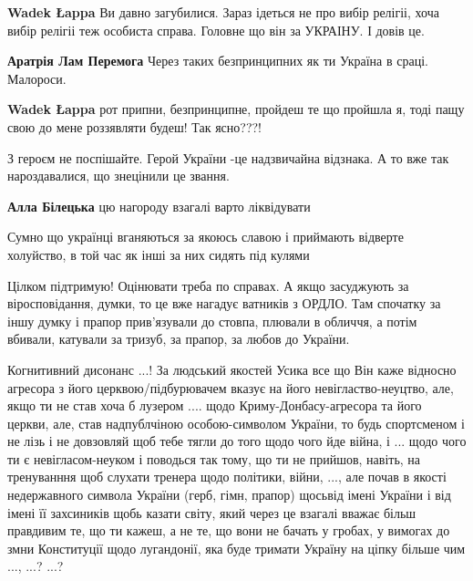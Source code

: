 \begin{itemize}
\begin{itemize}
\textbf{Wadek Łappa}
Ви давно загубилися.
Зараз ідеться не про вибір релігіі, хоча вибір релігіі теж особиста справа. Головне що він за УКРАІНУ. І довів це.

\textbf{Аратрія Лам Перемога} Через таких безпринципних як ти Україна в сраці. Малороси.

\textbf{Wadek Łappa} рот припни, безпринципне, пройдеш те що пройшла я, тоді пащу свою до мене роззявляти будеш! Так ясно???!
\end{itemize} %

З героєм не поспішайте. Герой України -це надзвичайна відзнака. А то вже так нароздавалися, що знецінили це звання.

\begin{itemize} %
\textbf{Алла Білецька} цю нагороду взагалі варто ліквідувати
\end{itemize} %

Сумно що українці вганяються за якоюсь славою і приймають відверте холуйство, в той час як інші за них сидять під кулями


Цілком підтримую! Оцінювати треба по справах. А якщо засуджують за
віросповідання, думки, то це вже нагадує ватників з ОРДЛО. Там спочатку за іншу
думку і прапор прив'язували до стовпа, плювали в обличчя, а потім вбивали,
катували за тризуб, за прапор, за любов до України.


Когнитивний дисонанс ...! За людський якостей Усика все що Він каже відносно
агресора з його церквою/підбурювачем вказує на його невігластво-неуцтво, але,
якщо ти не став хоча б лузером .... щодо Криму-Донбасу-агресора та його церкви,
але, став надпублчіною особою-символом України, то будь спортсменом і не лізь і
не довзовляй щоб тебе тягли до того щодо чого йде війна, і ... щодо чого ти є
невігласом-неуком і поводься так тому, що ти не прийшов, навіть, на тренуванння
щоб слухати тренера щодо політики, війни, ..., але почав в якості недержавного
символа України (герб, гімн, прапор) щосьвід імені України і від імені її
захсиників щобь казати світу, який через це взагалі вважає більш правдивим те,
що ти кажеш, а не те, що вони не бачать у гробах, у вимогах до змни Конституції
щодо лугандонії, яка буде тримати Україну на ціпку більше чим ..., ...? ...?



\end{itemize}
